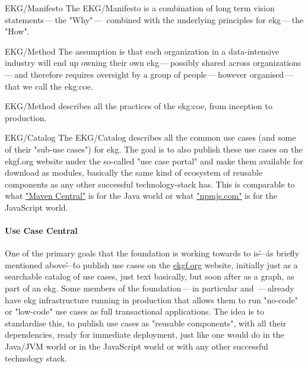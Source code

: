 \begin{basedescript}{%
    \desclabelstyle{\multilinelabel}
    \desclabelwidth{3cm}
}
    \item[EKG/Manifesto] The EKG/Manifesto is a combination of long term vision statements\,---\,the "Why"\,---\,%
                         combined with the underlying principles for \gls{ekg}\,---\,the "How".
    \item[EKG/Method]    The assumption is that each organization in a data-intensive industry will end up owning their
                         own \gls{ekg}\,---\,possibly shared across organizations\,---\,and therefore requires
                         oversight by a group of people\,---\,however organised\,---\,that we call
                         the \gls{ekg:coe}.

    EKG/Method describes all the practices of the \gls{ekg:coe}, from inception to production.
    \item[EKG/Catalog]   The EKG/Catalog describes all the common use cases (and some of their "sub-use cases")
                         for \gls{ekg}. The goal is to also publish these use cases on the ekgf.org website under the
                         so-called "use case portal" and make them available for download as modules, basically
                         the same kind of ecosystem of reusable components as any other successful technology-stack
                         has.
                         This is comparable to what \href{https://central.sonatype.org/}{"Maven Central"} is for the
                         Java world or what \href{https://docs.npmjs.com/about-npm}{"npmjs.com"} is for the
                         JavaScript world.
\end{basedescript}

\paragraph{Use Case Central}

One of the primary goals that the foundation is working towards to is\'---\'as briefly mentioned above\'---\'to publish
use cases on the \href{https://ekgf.org}{ekgf.org} website, initially just as a searchable catalog of use cases,
just text basically, but soon after as a graph, as part of an \gls{ekg}.
Some members of the foundation\,---\,in particular \agnos and \eccenca\,---\,already have \gls{ekg} infrastructure
running in production that allows them to run "no-code" or "\gls{low-code}" use cases as full transactional applications.
The idea is to standardise this, to publish use cases as "reusable components", with all their dependencies, ready
for immediate deployment, just like one would do in the Java/JVM world or in the JavaScript world or with any
other successful technology stack.

